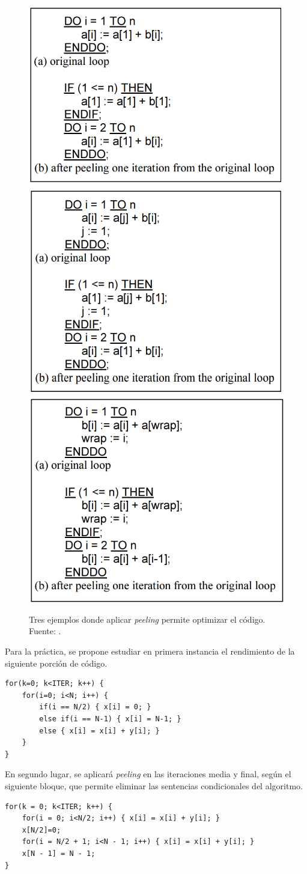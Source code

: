 \documentclass[11pt,a4paper,twoside]{article}
\theoremstyle{definition}
\begin{document}
	\begin{figure} [H] \centering
		\includegraphics[width=.41\textwidth]{art1.png}
		\includegraphics[width=.41\textwidth]{art2.png}
		\includegraphics[width=.41\textwidth]{art3.png}
		\caption{Tres ejemplos donde aplicar \textit{peeling} permite optimizar el código. Fuente: \cite{art}.}
		\label{fig:art1}
	\end{figure}
	
	Para la práctica, se propone estudiar en primera instancia el rendimiento de la siguiente porción de código.
	
	\begin{verbatim}
for(k=0; k<ITER; k++) {
	for(i=0; i<N; i++) {
		if(i == N/2) { x[i] = 0; }
		else if(i == N-1) { x[i] = N-1; }
		else { x[i] = x[i] + y[i]; }
	}
}
	\end{verbatim}

	En segundo lugar, se aplicará \textit{peeling} en las iteraciones media y final, según el siguiente bloque, que permite eliminar las sentencias condicionales del algoritmo.
	
	\begin{verbatim}
for(k = 0; k<ITER; k++) {
	for(i = 0; i<N/2; i++) { x[i] = x[i] + y[i]; }
	x[N/2]=0;
	for(i = N/2 + 1; i<N - 1; i++) { x[i] = x[i] + y[i]; }
	x[N - 1] = N - 1;
}
	\end{verbatim}
	
\end{document}
